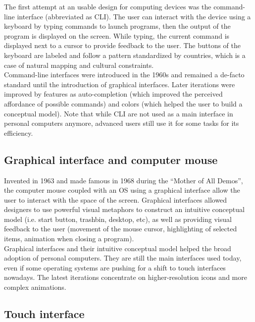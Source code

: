 \documentclass[a4paper,11pt] {article}
\theoremstyle{definition}
\begin{document}
    The first attempt at an usable design for computing devices was the command-line interface (abbreviated as CLI). The user can interact with the device using a keyboard by typing commands to launch programs, then the output of the program is displayed on the screen. While typing, the current command is displayed next to a cursor to provide feedback to the user. The buttons of the keyboard are labeled and follow a pattern standardized by countries, which is a case of natural mapping and cultural constraints.\\

    Command-line interfaces were introduced in the 1960s and remained a de-facto standard until the introduction of graphical interfaces. Later iterations were improved by features as auto-completion (which improved the perceived affordance of possible commands) and colors (which helped the user to build a conceptual model). Note that while CLI are not used as a main interface in personal computers anymore, advanced users still use it for some tasks for its efficiency.

    \subsection{Graphical interface and computer mouse}

    Invented in 1963 and made famous in 1968 during the ``Mother of All Demos''\cite{engelbart1968research}, the computer mouse coupled with an OS using a graphical interface allow the user to interact with the space of the screen. Graphical interfaces allowed designers to use powerful visual metaphors to construct an intuitive conceptual model (i.e. start button, trashbin, desktop, etc), as well as providing visual feedback to the user (movement of the mouse cursor, highlighting of selected items, animation when closing a program).\\

    Graphical interfaces and their intuitive conceptual model helped the broad adoption of personal computers. They are still the main interfaces used today, even if some operating systems are pushing for a shift to touch interfaces nowadays. The latest iterations concentrate on higher-resolution icons and more complex animations.

    \subsection{Touch interface}
\end{document}
